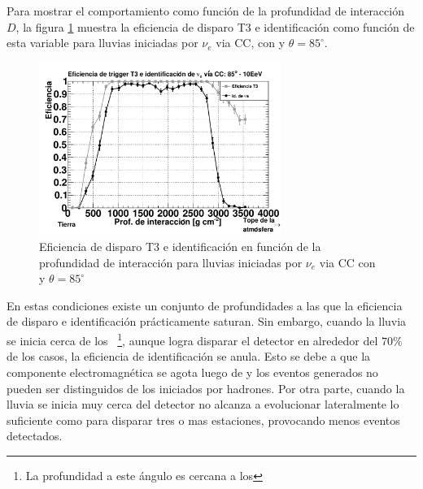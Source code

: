 	Para mostrar el comportamiento como funci\'on de la profundidad de interacci\'on $D$, la figura \ref{fig:effDG_tr_id} muestra la eficiencia de disparo T3 e identificación como función de esta variable para lluvias iniciadas por $\nu_e$ via CC, con  y $\theta=85^\circ$.
	\begin{figure}[ht!]
		\begin{center}
			\includegraphics[width=0.7\textwidth]{fig/resultadosAuger/eff_10EeV_85}
			\caption{Eficiencia de disparo T3 e identificación en función de la profundidad de interacción para lluvias iniciadas por $\nu_e$ via CC con  y $\theta=85^\circ$}
			\label{fig:effDG_tr_id}
		\end{center}
	\end{figure} 
	En estas condiciones existe un conjunto de profundidades a las que la eficiencia de disparo e identificaci\'on pr\'acticamente saturan. 
	Sin embargo, cuando la lluvia se inicia cerca de los ~\footnote{La profundidad a este \'angulo es cercana a los }, aunque logra disparar el detector en alrededor del $70\%$ de los casos, la eficiencia de identificaci\'on se anula.
	Esto se debe a que la componente electromagn\'etica se agota luego de  y los eventos generados no pueden ser distinguidos de los iniciados por hadrones.
	Por otra parte, cuando la lluvia se inicia muy cerca del detector no alcanza a evolucionar lateralmente lo suficiente como para disparar tres o mas estaciones, provocando menos eventos detectados. 
	
